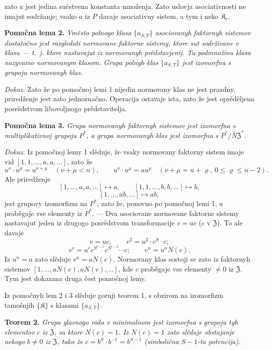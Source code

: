 \documentclass[11pt]{article}
\begin{document}
zato \(a\) jest jedina sučstvena konstanta množenja. Zato uslovja asociativnosti ne imajut sodržanje; vsako \(a\) iz \(P\) davaje asociativny sistem, a tym i neko \(\mathfrak K_r\).

\noindent\textbf{Pomočna lema 2.} \emph{Vměsto polnogo klasa \(\{a_{S,T}\}\) asociovanyh faktornyh sistemov dostatočno jest razgledati normovane faktorne sistemy, ktore sut sodrživane v klasu --- t.~j. ktore nastavajut iz normovanyh prědstavjenij. Tu podmnožinu klasa nazyvamo normovanym klasom. Grupa polnyh klas \(\{a_{S,T}\}\) jest izomorfna s grupoju normovanyh klas.}

\noindent\emph{Dokaz.} Zato že po pomočnoj lemi 1 nijedin normovany klas ne jest prazdny, priredženje jest zato jednoznačno. Operacija ostavaje ista, zato že jest oprěděljena posrědstvom libovoljnogo prědstavitelja.

\noindent\textbf{Pomočna lema 3.} \emph{Grupa normovanyh faktornyh sistemov jest izomorfna s multiplikativnoj grupoju \(P^*\), a grupa normovanyh klas jest izomorfna s \(P^*/N\mathfrak Z^*\).}

\noindent\emph{Dokaz.} Iz pomočnoj lemy 1 slěduje, že vsaky normovany faktorny sistem imaje vid \([1,1,\ldots,a,a,\ldots]\), zato že
\[
u^\nu\cdot u^\mu=u^{\nu+\mu}\quad(\nu+\mu<n),
\qquad
u^\nu\cdot u^\mu=au^\varrho\quad(\nu+\mu=n+\varrho,\ 0\leq\varrho\leq n-2).
\]
Ale priredženje
\[
[1,\ldots,a,a,\ldots]\mapsto a,
\qquad
[1,1,\ldots,b,b,\ldots]\mapsto b,
\]
\[
[1,\ldots,ab,\ldots]\mapsto ab,
\]
jest grupovy izomorfizm na \(P^*\), zato že, ponovno po pomočnoj lemi 1, \(a\) proběgaje vse elementy iz \(P^*\). --- Dva asociovane normovane faktorne sistemy nastavajut jeden iz drugogo posrědstvom transformacije \(v=uc\) (\(c\) v \(\mathfrak Z\)). To ale davaje
\[
v=uc,\qquad v^2=u^2\cdot c^S\cdot c;
\]
\[
v^r=u^r c^{S^{r-1}}c^{S^{r-2}}\cdots c;
\qquad
v^n=u^nN(c).
\]
Iz \(u^n=a\) zato slěduje \(v^n=aN(c)\). Normovany klas sostoji se zato iz faktornyh sistemov \([1,\ldots,aN(c),aN(c),\ldots]\), kde \(c\) proběgaje vse elementy \(\neq0\) iz \(\mathfrak Z\). Tym jest dokazana druga čest pomočnoj lemy.

Iz pomočnyh lem 2 i 3 slěduje gornji teorem 1, s obzirom na izomorfizm tamošnjih \(\{\mathfrak K\}\) s klasami \(\{a_{S,T}\}\).

\noindent\textbf{Teorem 2.} \emph{Grupa glavnogo roda v minimalnom jest izomorfna s grupoju tyh elementov \(c\) iz \(\mathfrak Z\), za ktore \(N(c)=1\). Iz \(N(c)=1\) zato slěduje obstajanje nekogo \(b\neq0\) iz \(\mathfrak Z\), tako že \(c=b^S\cdot b^{-1}=b^{S-1}\) (simbolična \(S-1\)-ta potencija).}
\end{document}
